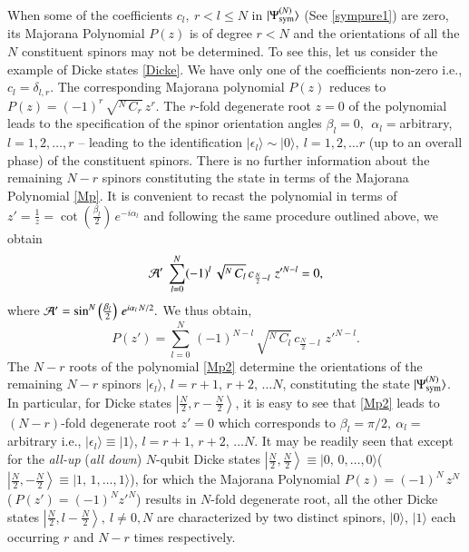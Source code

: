 {When some of the coefficients $c_l,\ r< l\leq N$ in $\vert \Psi^{(N)}_{\rm sym}\rangle$ (See \eqref{sympure1}) are zero, its Majorana Polynomial $P(z)$ is of degree $r<N$ and the orientations of all the $N$ constituent spinors may not be determined. To see this, let us consider the example of Dicke states \eqref{Dicke}. We have only one of the coefficients non-zero i.e., $c_l=\delta_{l,r}$.  The corresponding Majorana polynomial $P(z)$ reduces to  $P(z)=(-1)^r\, \sqrt{^N\, C_r}\, z^{r}$. The $r$-fold degenerate root  $z=0$ of the polynomial leads to the specification of the spinor orientation angles $\beta_l=0,\ \ \alpha_l=$arbitrary, $l=1,2,\ldots, r$ -- leading to the identification $\vert\epsilon_l\rangle\sim \vert 0\rangle,\ l=1,2,\ldots r$ (up to an overall phase) of the constituent spinors. There is no further information about the remaining $N-r$ spinors constituting the state in terms of the Majorana Polynomial \eqref{Mp}.  It is convenient to recast the  polynomial in terms of $z'=\frac{1}{z}=\cot \left(\frac{\beta_l}{2}\right)\,e^{-i\alpha_l}$ and following the same procedure outlined above, we obtain
\begin{equation}
{\cal A'}\  \sum_{l=0}^N (-1)^l\,\sqrt{^N\, C_l}\,  c_{\frac{N}{2}-l}\,  \, z'^{N-l}=0,\label{cmj03}  
\end{equation} 
where  ${\cal A'}=\sin^N\left(\frac{\beta_l}{2}\right)\,e^{i\alpha_l\, N/2}.$ We thus obtain, 
\begin{equation} 
P(z')=\sum_{l=0}^N\, (-1)^{N-l}\, \sqrt{^N\, C_l}\,  c_{\frac{N}{2}-l}\,  \, z'^{N-l}.\label{Mp2}
\end{equation}
The $N-r$ roots of the  polynomial \eqref{Mp2} determine the orientations of the remaining $N-r$ spinors $\vert\epsilon_l\rangle$, $l=r+1,\,r+2,\,\ldots N$, constituting the state $\vert \Psi^{(N)}_{\rm sym}\rangle$. In particular, for Dicke states $\left\vert \frac{N}{2},r-\frac{N}{2}\right\rangle$, it is easy to see that \eqref{Mp2} leads to $(N-r)$-fold degenerate root $z'=0$ which corresponds to $\beta_l=\pi/2,\ \alpha_l=$ arbitrary i.e., $\vert \epsilon_l \rangle \equiv \vert 1 \rangle$, $l=r+1,\,r+2,\, \ldots N$. It may be readily seen that except for the  {\em all-up} ({\em all down}) $N$-qubit Dicke states $\left\vert \frac{N}{2}, \frac{N}{2}\right\rangle\equiv \vert 0,\,0,\ldots,0\rangle$( $\left\vert \frac{N}{2},-\frac{N}{2}\right\rangle\equiv \vert 1,\,1,\ldots,1 \rangle$), for which the Majorana Polynomial  $P(z)=(-1)^N\, z^N$ ($\ P(z')=(-1)^N z'^{N}$) results in $N$-fold degenerate root, all the other  Dicke states $\left\vert \frac{N}{2},l-\frac{N}{2}\right\rangle,\ l\neq 0, N$ are characterized by two distinct spinors, $\vert 0\rangle$, $\vert 1 \rangle$ each occurring $r$ and $N-r$ times respectively. 

}
